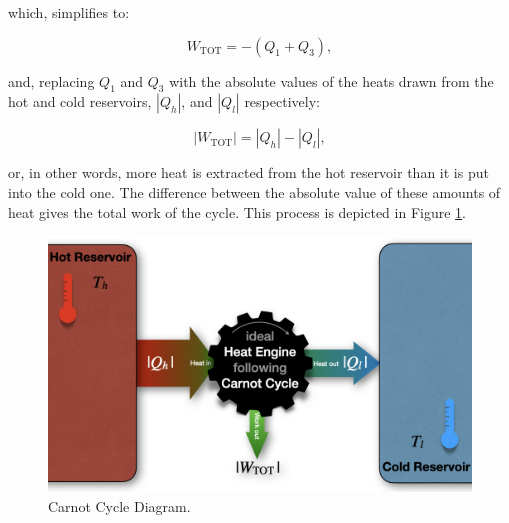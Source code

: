 \documentclass[
  9pt,
]{extbook}
\theoremstyle{definition}
\theoremstyle{definition}
\theoremstyle{definition}
\theoremstyle{remark}
\begin{document}
which, simplifies to:

\begin{equation}
W_{\text{TOT}}=-(Q_1+Q_3),
  \label{eq:WtotCC3}
\end{equation}

and, replacing \(Q_1\) and \(Q_3\) with the absolute values of the heats drawn from the hot and cold reservoirs, \(\left| Q_h \right|\), and \(\left| Q_l \right|\) respectively:

\begin{equation}
\left| W_{\text{TOT}} \right| = \left| Q_h \right| - \left| Q_l \right|,
  \label{eq:QtotCC2}
\end{equation}

or, in other words, more heat is extracted from the hot reservoir than it is put into the cold one. The difference between the absolute value of these amounts of heat gives the total work of the cycle. This process is depicted in Figure \ref{fig:FigCarnotEff}.

\begin{figure}

{\centering \includegraphics[width=0.8\linewidth]{./img/OEP_Figures.009} 

}

\caption{Carnot Cycle Diagram.}\label{fig:FigCarnotEff}
\end{figure}
\end{document}
